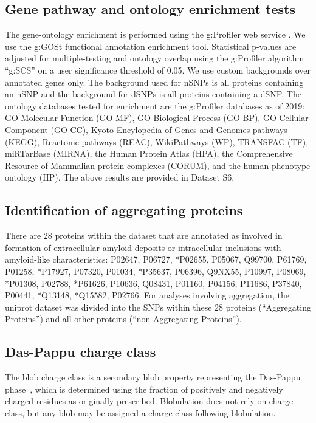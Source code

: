 \documentclass[9pt,twocolumn,twoside,lineno]{pnas-new}
\newcommand{\chargechar}{charge class}
\begin{document}
\subsection*{Gene pathway and ontology enrichment tests}
The gene-ontology enrichment is performed using the g:Profiler web service \cite{Raudvere2019}. We use the g:GOSt functional annotation enrichment tool. Statistical p-values are adjusted for multiple-testing and ontology overlap using the g:Profiler algorithm ``g:SCS'' on a user significance threshold of 0.05. We use custom backgrounds over annotated genes only. The background used for nSNPs is all proteins containing an nSNP and the background for dSNPs is all proteins containing a dSNP. The ontology databases tested for enrichment are the g:Profiler databases as of 2019: GO Molecular Function (GO MF), GO Biological Process (GO BP), GO Cellular Component (GO CC), Kyoto Encylopedia of Genes and Genomes pathways (KEGG), Reactome pathways (REAC), WikiPathways (WP), TRANSFAC (TF), miRTarBase (MIRNA), the Human Protein Atlas (HPA), the Comprehensive Resource of Mammalian protein complexes (CORUM), and the human phenotype ontology (HP). The above results are provided in Dataset S6.

\subsection*{Identification of aggregating proteins}
There are 28 proteins within the dataset that are annotated as involved in formation of extracellular amyloid deposits or intracellular inclusions with amyloid-like characteristics: P02647, P06727, *P02655, P05067, Q99700, P61769, P01258, *P17927, P07320, P01034, *P35637, P06396, Q9NX55, P10997, P08069, *P01308, P02788, *P61626, P10636, Q08431, P01160, P04156, P11686, P37840, P00441, *Q13148, *Q15582, P02766. For analyses involving aggregation, the uniprot dataset was divided into the SNPs within these 28 proteins (``Aggregating Proteins'') and all other proteins (``non-Aggregating Proteins''). 

\subsection*{Das-Pappu charge class}
The blob \chargechar{} is a secondary blob property representing the Das-Pappu phase~\citep{Das2013}, which is determined using the fraction of positively and negatively charged residues as originally prescribed. Blobulation does not rely on \chargechar, but any blob may be assigned a \chargechar{} following blobulation.
\end{document}
